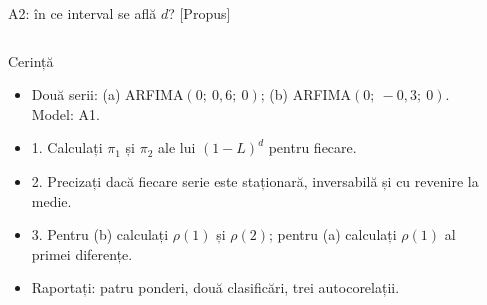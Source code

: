 \begin{frame}{A2: în ce interval se află $d$? [Propus]}
\propsub
\itemsize{\scriptsize}
\begin{columns}[T]
\begin{column}{\taskw}
\begin{block}{Cerință}
\begin{itemize}
    \item Două serii: (a) ARFIMA$(0;\ 0{,}6;\ 0)$; (b) ARFIMA$(0;\ -0{,}3;\ 0)$. Model: A1.
    \item 1. Calculați $\pi_1$ și $\pi_2$ ale lui $(1-L)^d$ pentru fiecare.
    \item 2. Precizați dacă fiecare serie este staționară, inversabilă și cu revenire la medie.
    \item 3. Pentru (b) calculați $\rho(1)$ și $\rho(2)$; pentru (a) calculați $\rho(1)$ al primei diferențe.
    \item Raportați: patru ponderi, două clasificări, trei autocorelații.
\end{itemize}
\end{block}
\end{column}
\begin{column}{\solw}
\end{column}
\end{columns}
\end{frame}


